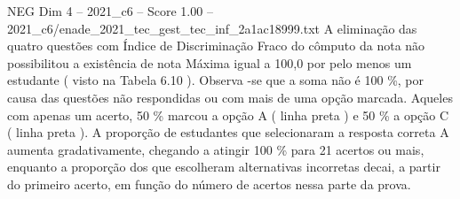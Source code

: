 \begin{textsample}{NEG Dim 4 – 2021\_c6 – Score 1.00 – 2021\_c6/enade\_2021\_tec\_gest\_tec\_inf\_2a1ac18999.txt}
A eliminação das quatro questões com Índice de Discriminação Fraco do cômputo da nota não possibilitou a existência de nota Máxima igual a 100,0 por pelo menos um estudante ( visto na Tabela 6.10 ).
Observa -se que a soma não é 100 \%, por causa das questões não respondidas ou com mais de uma opção marcada.
Aqueles com apenas um acerto, 50 \% marcou a opção A ( linha preta ) e 50 \% a opção C ( linha preta ).
A proporção de estudantes que selecionaram a resposta correta A aumenta gradativamente, chegando a atingir 100 \% para 21 acertos ou mais, enquanto a proporção dos que escolheram alternativas incorretas decai, a partir do primeiro acerto, em função do número de acertos nessa parte da prova.

\end{textsample}
